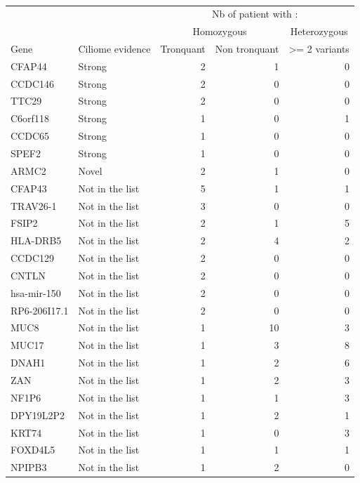 \documentclass[12pt,twoside]{reedthesis}
\theoremstyle{definition}
\theoremstyle{definition}
\theoremstyle{remark}
\begin{document}
  \begin{longtable}[t]{llrrr}
  \caption{\label{tab:annexetabinit}}\\
  \toprule
  \multicolumn{1}{c}{ } & \multicolumn{1}{c}{ } & \multicolumn{3}{c}{Nb of patient with : } \\
  \cmidrule(l{2pt}r{2pt}){3-5}
  \multicolumn{1}{c}{ } & \multicolumn{1}{c}{ } & \multicolumn{2}{c}{Homozygous} & \multicolumn{1}{c}{Heterozygous} \\
  \cmidrule(l{2pt}r{2pt}){3-4} \cmidrule(l{2pt}r{2pt}){5-5}
  Gene & Ciliome evidence & Tronquant & Non tronquant & >= 2 variants\\
  \midrule
  CFAP44 & Strong & 2 & 1 & 0\\
  CCDC146 & Strong & 2 & 0 & 0\\
  TTC29 & Strong & 2 & 0 & 0\\
  C6orf118 & Strong & 1 & 0 & 1\\
  CCDC65 & Strong & 1 & 0 & 0\\
  \addlinespace
  SPEF2 & Strong & 1 & 0 & 0\\
  ARMC2 & Novel & 2 & 1 & 0\\
  CFAP43 & Not in the list & 5 & 1 & 1\\
  TRAV26-1 & Not in the list & 3 & 0 & 0\\
  FSIP2 & Not in the list & 2 & 1 & 5\\
  \addlinespace
  HLA-DRB5 & Not in the list & 2 & 4 & 2\\
  CCDC129 & Not in the list & 2 & 0 & 0\\
  CNTLN & Not in the list & 2 & 0 & 0\\
  hsa-mir-150 & Not in the list & 2 & 0 & 0\\
  RP6-206I17.1 & Not in the list & 2 & 0 & 0\\
  \addlinespace
  MUC8 & Not in the list & 1 & 10 & 3\\
  MUC17 & Not in the list & 1 & 3 & 8\\
  DNAH1 & Not in the list & 1 & 2 & 6\\
  ZAN & Not in the list & 1 & 2 & 3\\
  NF1P6 & Not in the list & 1 & 1 & 3\\
  \addlinespace
  DPY19L2P2 & Not in the list & 1 & 2 & 1\\
  KRT74 & Not in the list & 1 & 0 & 3\\
  FOXD4L5 & Not in the list & 1 & 1 & 1\\
  NPIPB3 & Not in the list & 1 & 2 & 0\\

\end{longtable}
\end{document}
